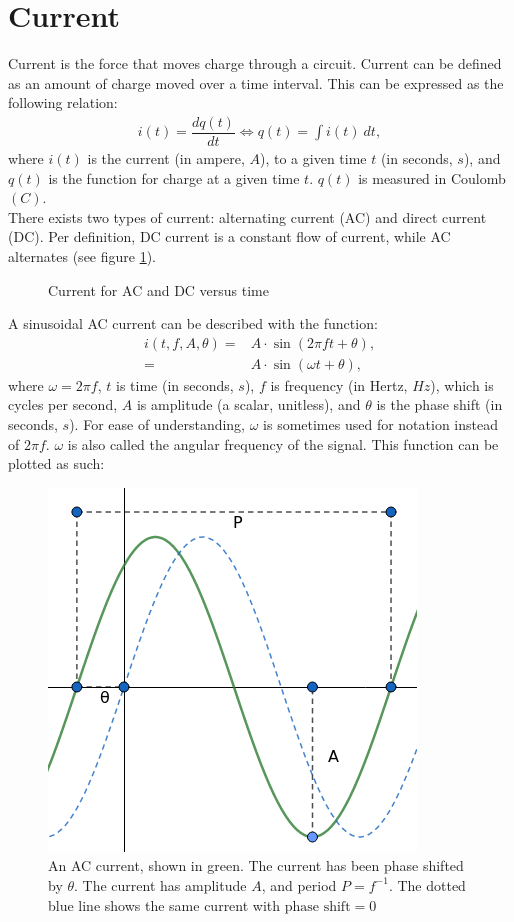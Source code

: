 \section{Current}
Current is the force that moves charge through a circuit. Current can be defined as an amount of charge moved over a time interval. This can be expressed as the following relation:
\begin{align}
i(t)=\dfrac{dq(t)}{dt} \Leftrightarrow q(t)=\int i(t)\ dt,
\label{I=dq/dt}
\end{align}
where $i(t)$ is the current (in ampere, $A$), to a given time $t$ (in seconds, $s$), and $q(t)$ is the function for charge at a given time $t$. $q(t)$ is measured in Coulomb $(C)$.
\\
There exists two types of current: alternating current (AC) and direct current (DC). Per definition, DC current is a constant flow of current, while AC alternates (see figure \ref{fig:ACDC}). 
\begin{figure}[H] 

\caption{Current for AC and DC versus time}
\label{fig:ACDC}
\end{figure}
\noindent
A sinusoidal AC current can be described with the function: 
\begin{align}
i\left(t, f, A, \theta\right) =& A\cdot \sin{\left(2\pi ft + \theta\right)}, \nonumber
\\
=& A \cdot \sin{\left(\omega t + \theta\right)}, \label{eq:omega}
\end{align}
where $\omega = 2\pi f$, $t$ is time (in seconds, $s$), $f$ is frequency (in Hertz, $Hz$), which is cycles per second, $A$ is amplitude (a scalar, unitless), and $\theta$ is the phase shift (in seconds, $s$).
For ease of understanding, $\omega$ is sometimes used for notation instead of $2\pi f$. $\omega$ is also called the angular frequency of the signal.
This function can be plotted as such:
\begin{figure}[H]
	\centering
	\includegraphics[scale=0.7]{fig/img/AC.png}
	\caption{An AC current, shown in green. The current has been phase shifted by $\theta$. The current has amplitude $A$, and period $P=f^{-1}$. The dotted blue line shows the same current with $\text{phase shift} =0$}
\end{figure}


